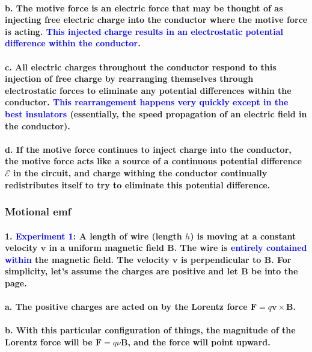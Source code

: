 \documentclass{article}
\begin{document}
\paragraph{\indent b. The motive force is an electric force that may be thought of as injecting free electric charge into the conductor where the motive force is acting. \textcolor{blue}{This injected charge results in an electrostatic potential difference within the conductor}.}
\paragraph{\indent c. All electric charges throughout the conductor respond to this injection of free charge by rearranging themselves through electrostatic forces to eliminate any potential differences within the conductor. \textcolor{blue}{This rearrangement happens very quickly except in the best insulators} (essentially, the speed propagation of an electric field in the conductor).}
\paragraph{\indent d. If the motive force continues to inject charge into the conductor, the motive force acts like a source of a continuous potential difference $\mathcal{E}$ in the circuit, and charge withing the conductor continually redistributes itself to try to eliminate this potential difference.}
\subsubsection{Motional emf}
\paragraph{1. \textcolor{blue}{Experiment 1}: A length of wire (length $h$) is moving at a constant velocity $\boldsymbol{v}$ in a uniform magnetic field $\boldsymbol{B}$. The wire is \textcolor{blue}{entirely contained within} the magnetic field. The velocity $\boldsymbol{v}$ is perpendicular to $\boldsymbol{B}$. For simplicity, let's assume the charges are positive and let $\boldsymbol{B}$ be into the page.}
\paragraph{\indent a. The positive charges are acted on by the Lorentz force $\boldsymbol{F}=q\boldsymbol{v}\times\boldsymbol{B}$.}
\paragraph{\indent b. With this particular configuration of things, the magnitude of the Lorentz force will be $\boldsymbol{F}=q\nu\boldsymbol{B}$, and the force will point upward.}
\end{document}

